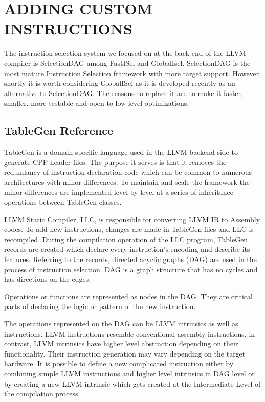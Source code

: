 \clearpage
\chapter{ADDING CUSTOM INSTRUCTIONS}\label{ch:custom_instr}
The instruction selection system we focused on at the back-end of the LLVM compiler is SelectionDAG among FastISel and GlobalIsel. SelectionDAG is the most mature Instruction Selection framework with more target support. However, shortly it is worth considering GlobalISel as it is developed recently as an alternative to SelectionDAG. The reasons to replace it are to make it faster, smaller, more testable and open to low-level optimizations.
\section{TableGen Reference}
TableGen is a domain-specific language used in the LLVM backend side to generate CPP header files. The purpose it serves is that it removes the redundancy of instruction declaration code which can be common to numerous architectures with minor differences. To maintain and scale the framework the minor differences are implemented level by level at a series of inheritance operations between TableGen classes. 

\par
 LLVM Static Compiler, LLC, is responsible for converting LLVM IR to Assembly codes. To add new instructions, changes are made in TableGen files and LLC is recompiled. During the compilation operation of the LLC program, TableGen records are created which declare every instruction’s encoding and describe its features. Referring to the records, directed acyclic graphs (DAG) are used in the process of instruction selection. 
 DAG is a graph structure that has no cycles and has directions on the edges.

 Operations or functions are represented as nodes in the DAG. They are critical parts of declaring the logic or pattern of the new instruction. 
\par

The operations represented on the DAG can be LLVM intrinsics as well as instructions. LLVM instructions resemble conventional assembly instructions, in contrast, LLVM intrinsics have higher level abstraction depending on their functionality. Their instruction generation may vary depending on the target hardware. It is possible to define a new complicated instruction either by combining simple LLVM instructions and higher level intrinsics in DAG level or by creating a new LLVM intrinsic which gets created at the Intermediate Level of the compilation process.

